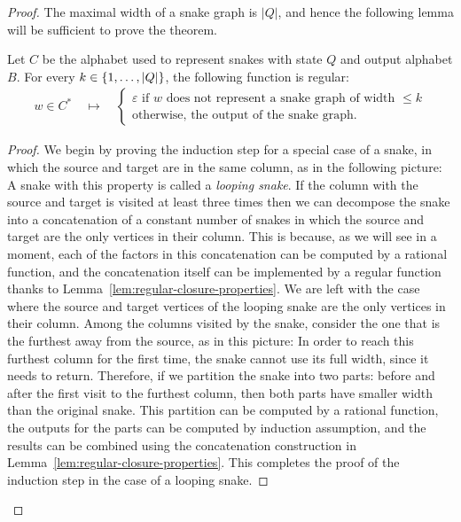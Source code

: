 \begin{proof}
The maximal width of a snake graph is $|Q|$, and hence the following lemma will be sufficient to prove the theorem. 
\begin{lemma}\label{lem:output-of-snake-graph-is-regular}
    Let $C$ be the alphabet used to represent snakes with state $Q$ and output alphabet $B$. For every $k \in \{1,\ldots,|Q|\}$, the following function is regular:
    \begin{align*}
    w \in C^* \quad \mapsto \quad 
    \begin{cases}
        \text{$\varepsilon$ if $w$ does not represent a snake graph of width $\le k$}\\
        \text{otherwise, the output of the snake graph.}
    \end{cases}
    \end{align*}
\end{lemma}
\begin{proof}
We begin by proving the induction step for a special case of a snake, in which the source and target are in the same column, as in the following picture:
    A snake with this property is called a \emph{looping snake}. 
    If the column with the source and target is visited at least three times then we can decompose the snake into a concatenation of a constant number of snakes in which the source and target are the only vertices in their column. This is because, as we will see in a moment, each of the factors in this concatenation can be computed by a rational function, and the concatenation itself  can be implemented by a regular function thanks to Lemma~\ref{lem:regular-closure-properties}.
    We are left with the case where the source and target vertices of the looping snake are the only vertices in their column. Among the columns visited by the snake, consider the one that is the furthest away from the source, as in this picture:
    In order to reach this furthest column for the first time, the snake cannot use its full width, since it needs to return. Therefore, if we partition the snake into two parts: before and after the first visit to the furthest column, then both parts have smaller width than the original snake. This partition can be computed by a rational function, the outputs for the parts can be computed by induction assumption, and the results can be combined using the concatenation construction in Lemma~\ref{lem:regular-closure-properties}. This completes the proof of the induction step in the case of a looping snake. 
    


\end{proof}
\end{proof}
